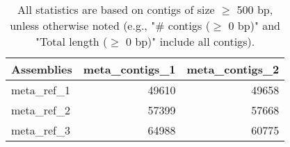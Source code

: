 \documentclass[12pt,a4paper]{article}
\begin{document}
\begin{table}[ht]
\begin{center}
\caption{All statistics are based on contigs of size $\geq$ 500 bp, unless otherwise noted (e.g., "\# contigs ($\geq$ 0 bp)" and "Total length ($\geq$ 0 bp)" include all contigs).}
\begin{tabular}{|l*{2}{|r}|}
\hline
Assemblies & meta\_contigs\_1 & meta\_contigs\_2 \\ \hline
meta\_ref\_1 & 49610 & 49658 \\ \hline
meta\_ref\_2 & 57399 & 57668 \\ \hline
meta\_ref\_3 & 64988 & 60775 \\ \hline
\end{tabular}
\end{center}
\end{table}
\end{document}
